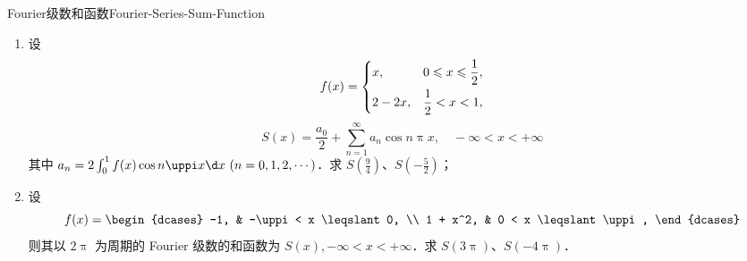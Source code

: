 \begin{problem}{Fourier级数和函数}{Fourier-Series-Sum-Function}
    \begin{enumerate}
        \item 设
              \begin{equation}
                  f(x) = \begin{dcases} x, & 0 \leqslant x \leqslant \frac{1}{2}, \\ 2 - 2x, & \frac{1}{2} < x < 1, \end{dcases}
              \end{equation}
              \begin{equation}
                  S(x) = \frac{a_0}{2} + \sum_{n=1}^{\infty} a_n \cos n \uppi x, \quad -\infty < x < +\infty
              \end{equation}
              其中 $a_n = 2 \int_{0}^{1} f(x) \cos n \uppi x \d x \ (n = 0, 1, 2, \cdots)$．求 $S\left(\frac{9}{4}\right)$、$S\left(-\frac{5}{2}\right)$；
        \item 设
              \begin{equation}
                  f(x) = \begin{dcases} -1, & -\uppi < x \leqslant 0, \\ 1 + x^2, & 0 < x \leqslant \uppi, \end{dcases}
              \end{equation}
              则其以 $2\uppi$ 为周期的 Fourier 级数的和函数为 $S(x), -\infty < x < +\infty$．求 $S(3\uppi)$、$S(-4\uppi)$．
    \end{enumerate}
\end{problem}

